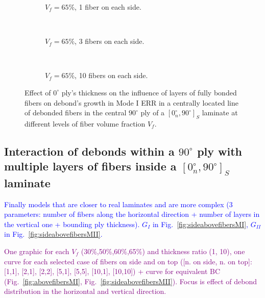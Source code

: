 \documentclass[review]{elsarticle}
\begin{document}
\begin{figure}[!h]
    \begin{subfigure}[b]{0.3\textwidth}
        \caption{$V_{f}=65\%$, 1 fiber on each side.}\label{subfig:abovefiber65MIIcase1}
    \end{subfigure} ~
   \begin{subfigure}[b]{0.3\textwidth}
        \caption{$V_{f}=65\%$, 3 fibers on each side.}\label{subfig:abovefiber65MIIcase2}
    \end{subfigure} ~
\begin{subfigure}[b]{0.3\textwidth}
        \caption{$V_{f}=65\%$, 10 fibers on each side.}\label{subfig:abovefiber65MIIcase3}
    \end{subfigure}

\caption{Effect of $0^{\circ}$ ply's thickness on the influence of layers of fully bonded fibers on debond's growth in Mode I ERR in a centrally located line of debonded fibers in the central $90^{\circ}$ ply of a $\left[0^{\circ}_{n}, 90^{\circ}\right]_{S}$ laminate at different levels of fiber volume fraction $V_{f}$.}\label{fig:abovefibersthicknessMII}
\end{figure}

\subsection{Interaction of debonds within a $90^{\circ}$ ply with multiple layers of fibers inside a $\left[0^{\circ}_{n}, 90^{\circ}\right]_{S}$ laminate}

\textcolor{blue}{Finally models that are closer to real laminates and are more complex (3 parameters: number of fibers along the horizontal direction + number of layers in the vertical one +  bounding ply thickness).  $G_{I}$ in Fig.~\ref{fig:sideabovefibersMI}, $G_{II}$ in Fig.~\ref{fig:sideabovefibersMII}.}

\textcolor{purple}{One graphic for each $V_{f}$ (30\%,50\%,60\%,65\%) and thickness ratio (1, 10), one curve for each selected case of fibers on side and on top ([n. on side, n. on top]: [1,1], [2,1], [2,2], [5,1], [5,5], [10,1], [10,10]) + curve for equivalent BC (Fig.~\ref{fig:abovefibersMI}, Fig.~\ref{fig:sideabovefibersMII}). Focus is effect of debond distribution in the horizontal and vertical direction.}\\
\end{document}
